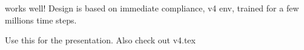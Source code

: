 works well! Design is based on immediate compliance, v4 env, trained for a few millions time steps.

Use this for the presentation. Also check out v4.tex
